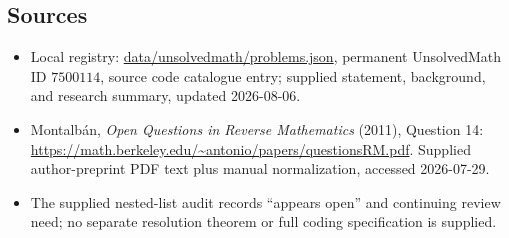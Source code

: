 \documentclass[11pt]{article}
\begin{document}
\subsection{Sources}
\begin{itemize}
\item Local registry: \url{data/unsolvedmath/problems.json}, permanent UnsolvedMath ID \(7500114\), source code catalogue entry; supplied statement, background, and research summary, updated 2026-08-06.
\item Montalbán, \emph{Open Questions in Reverse Mathematics} (2011), Question 14: \url{https://math.berkeley.edu/~antonio/papers/questionsRM.pdf}. Supplied author-preprint PDF text plus manual normalization, accessed 2026-07-29.
\item The supplied nested-list audit records ``appears open'' and continuing review need; no separate resolution theorem or full coding specification is supplied.
\end{itemize}
\end{document}
